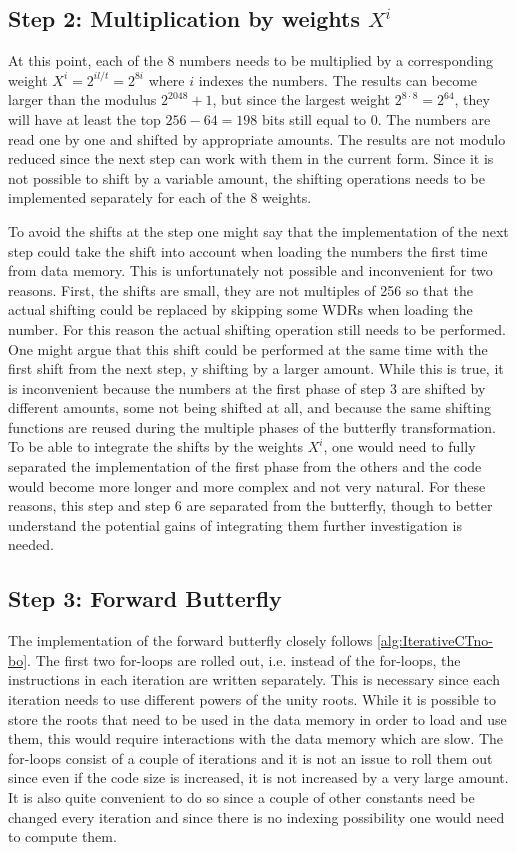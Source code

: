 \subsection{Step 2: Multiplication by weights $X^i$}

At this point, each of the 8 numbers needs to be multiplied by a corresponding weight $X^i = 2^{i l/t} = 2^{8i}$ where $i$ indexes the numbers. The results can become larger than the modulus $2^{2048} + 1$, but since the largest weight $2^{8 \cdot 8} = 2^{64}$, they will have at least the top $256 - 64 = 198$ bits still equal to 0. The numbers are read one by one and shifted by appropriate amounts. The results are not modulo reduced since the next step can work with them in the current form. Since it is not possible to shift by a variable amount, the shifting operations needs to be implemented separately for each of the 8 weights.

To avoid the shifts at the step one might say that the implementation of the next step could take the shift into account when loading the numbers the first time from data memory. This is unfortunately not possible and inconvenient for two reasons. First, the shifts are small, they are not multiples of 256 so that the actual shifting could be replaced by skipping some WDRs when loading the number. For this reason the actual shifting operation still needs to be performed. One might argue that this shift could be performed at the same time with the first shift from the next step, y shifting by a larger amount. While this is true, it is inconvenient because the numbers at the first phase of step 3 are shifted by different amounts, some not being shifted at all, and because the same shifting functions are reused during the multiple phases of the butterfly transformation. To be able to integrate the shifts by the weights $X^i$, one would need to fully separated the implementation of the first phase from  the others and the code would become more longer and more complex and not very natural. For these reasons, this step and step 6 are separated from the butterfly, though to better understand the potential gains of integrating them further investigation is needed.


\subsection{Step 3: Forward Butterfly}

The implementation of the forward butterfly closely follows \cref{alg:IterativeCTno-bo}. The first two for-loops are rolled out, i.e. instead of the for-loops, the instructions in each iteration are written separately. This is necessary since each iteration needs to use different powers of the unity roots. While it is possible to store the roots that need to be used in the data memory in order to load and use them, this would require interactions with the data memory which are slow. The for-loops consist of a couple of iterations and it is not an issue to roll them out since even if the code size is increased, it is not increased by a very large amount. It is also quite convenient to do so since a couple of other constants need be changed every iteration and since there is no indexing possibility one would need to compute them. 


